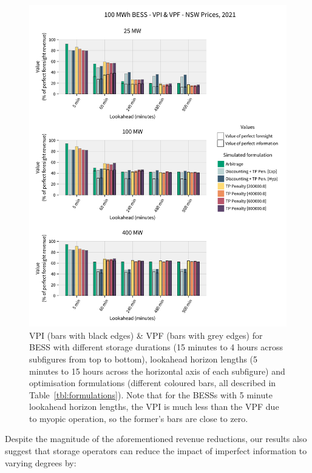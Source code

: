 \documentclass[12pt,a4paper,]{report}
\begin{document}
\begin{figure}
\hypertarget{fig:vpi_vpf}{%
\centering
\includegraphics{source/figures/NSW_100_allformulations_vpi_vpf.pdf}
\caption{VPI (bars with black edges) \& VPF (bars with grey edges) for
BESS with different storage durations (15 minutes to 4 hours across
subfigures from top to bottom), lookahead horizon lengths (5 minutes to
15 hours across the horizontal axis of each subfigure) and optimisation
formulations (different coloured bars, all described in
Table~\ref{tbl:formulations}). Note that for the BESSs with 5 minute
lookahead horizon lengths, the VPI is much less than the VPF due to
myopic operation, so the former's bars are close to
zero.}\label{fig:vpi_vpf}
}
\end{figure}

Despite the magnitude of the aforementioned revenue reductions, our
results also suggest that storage operators can reduce the impact of
imperfect information to varying degrees by:
\end{document}
